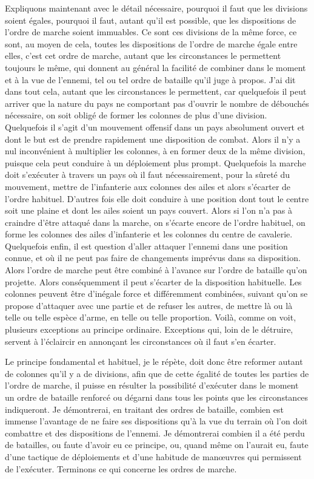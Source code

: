 \documentclass[french,twoside]{book} %
\begin{document}
Expliquons maintenant avec le détail nécessaire, pourquoi il faut que les divisions soient égales, pourquoi il faut, autant qu’il est possible, que les dispositions de l’ordre de marche soient immuables. Ce sont ces divisions de la même force, ce sont, au moyen de cela, toutes les dispositions de l’ordre de marche égale entre elles, c’est cet ordre de marche, autant que les circonstances le permettent toujours le même, qui donnent au général la facilité de combiner dans le moment et à la vue de l’ennemi, tel ou tel ordre de bataille qu’il juge à propos. J’ai dit dans tout cela, autant que les circonstances le permettent, car quelquefois il peut arriver que la nature du pays ne comportant pas d’ouvrir le nombre de débouchés nécessaire, on soit obligé de former les colonnes de plus d’une division. Quelquefois il s’agit d’un mouvement offensif dans un pays absolument ouvert et dont le but est de prendre rapidement une disposition de combat. Alors il n’y a nul inconvénient à multiplier les colonnes, à en former deux de la même division, puisque cela peut conduire à un déploiement plus prompt. Quelquefois la marche doit s’exécuter à travers un pays où il faut nécessairement, pour la sûreté du mouvement, mettre de l’infanterie aux colonnes des ailes et alors s’écarter de l’ordre habituel. D’autres fois elle doit conduire à une position dont tout le centre soit une plaine et dont les ailes soient un pays couvert. Alors si l’on n’a pas à craindre d’être attaqué dans la marche, on s’écarte encore de l’ordre habituel, on forme les colonnes des ailes d’infanterie et les colonnes du centre de cavalerie. Quelquefois enfin, il est question d’aller attaquer l’ennemi dans une position connue, et où il ne peut pas faire de changements imprévus dans sa disposition. Alors l’ordre de marche peut être combiné à l’avance sur l’ordre de bataille qu’on projette. Alors conséquemment il peut s’écarter de la disposition habituelle. Les colonnes peuvent être d’inégale force et différemment combinées, suivant qu’on se propose d’attaquer avec une partie et de refuser les autres, de mettre là ou là telle ou telle espèce d’arme, en telle ou telle proportion. Voilà, comme on voit, plusieurs exceptions au principe ordinaire. Exceptions qui, loin de le détruire, servent à l’éclaircir en annonçant les circonstances où il faut s’en écarter.\par
Le principe fondamental et habituel, je le répète, doit donc être reformer autant de colonnes qu’il y a de divisions, afin que de cette égalité de toutes les parties de l’ordre de marche, il puisse en résulter la possibilité d’exécuter dans le moment un ordre de bataille renforcé ou dégarni dans tous les points que les circonstances indiqueront. Je démontrerai, en traitant des ordres de bataille, combien est immense l’avantage de ne faire ses dispositions qu’à la vue du terrain où l’on doit combattre et des dispositions de l’ennemi. Je démontrerai combien il a été perdu de batailles, ou faute d’avoir eu ce principe, ou, quand même on l’aurait eu, faute d’une tactique de déploiements et d’une habitude de manœuvres qui permissent de l’exécuter. Terminons ce qui concerne les ordres de marche.\par
\end{document}

